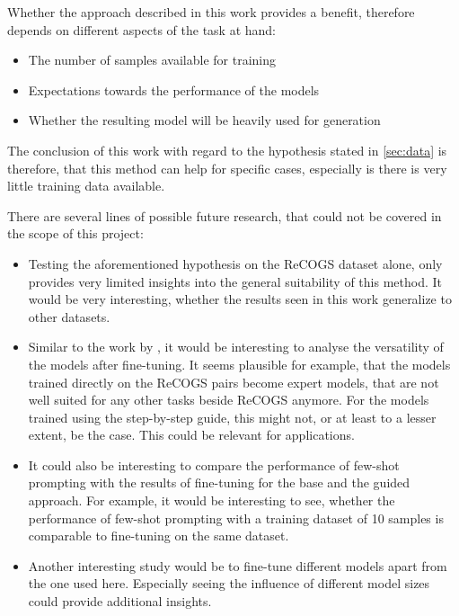 \documentclass[11pt]{article}
\begin{document}
    Whether the approach described in this work provides a benefit, therefore depends on different aspects of the task at hand:
    \begin{itemize}
        \item The number of samples available for training
        \item Expectations towards the performance of the models
        \item Whether the resulting model will be heavily used for generation
    \end{itemize}
    The conclusion of this work with regard to the hypothesis stated in \ref{sec:data} is therefore, that this method
    can help for specific cases, especially is there is very little training data available.

    There are several lines of possible future research, that could not be covered in the scope of this project:
    \begin{itemize}
        \item Testing the aforementioned hypothesis on the ReCOGS dataset alone, only provides very limited insights into
        the general suitability of this method.
        It would be very interesting, whether the results seen in this work generalize to other datasets.
        \item Similar to the work by \cite{chen_learning_2023}, it would be interesting to analyse the versatility of the
        models after fine-tuning.
        It seems plausible for example, that the models trained directly on the ReCOGS pairs become expert models, that
        are not well suited for any other tasks beside ReCOGS anymore.
        For the models trained using the step-by-step guide, this might not, or at least to a lesser extent, be the case.
        This could be relevant for applications.
        \item It could also be interesting to compare the performance of few-shot prompting with the results of fine-tuning
        for the base and the guided approach.
        For example, it would be interesting to see, whether the performance of few-shot prompting with a training dataset
        of 10 samples is comparable to fine-tuning on the same dataset.
        \item Another interesting study would be to fine-tune different models apart from the one used here.
        Especially seeing the influence of different model sizes could provide additional insights.
    \end{itemize}
\end{document}

